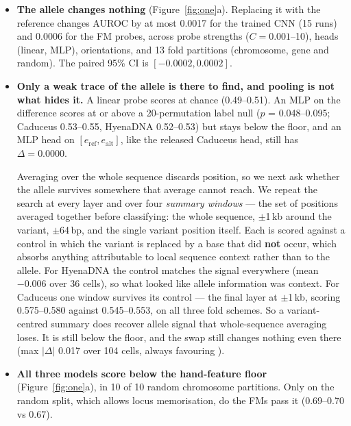 \begin{itemize}
\item \textbf{The allele changes nothing} (Figure~\ref{fig:one}a). Replacing it
with the reference changes AUROC by at most 0.0017 for the trained CNN (15 runs)
and 0.0006 for the FM probes, across probe strengths ($C = 0.001$--10), heads
(linear, MLP), orientations, and 13 fold partitions (chromosome, gene and
random). The paired 95\% CI is $[-0.0002, 0.0002]$.
\item \textbf{Only a weak trace of the allele is there to find, and pooling is
not what hides it.} A linear \diffonly{} probe scores at chance (0.49--0.51). An
MLP on the difference scores at or above a 20-permutation label null ($p$ =
0.048--0.095; Caduceus 0.53--0.55, HyenaDNA 0.52--0.53) but stays below the floor, and an MLP head on
$[e_{\mathrm{ref}}, e_{\mathrm{alt}}]$, like the released Caduceus head, still
has $\Delta = 0.0000$.

Averaging over the whole sequence discards position, so we next ask whether the
allele survives somewhere that average cannot reach. We repeat the search at
every layer and over four \emph{summary windows} --- the set of positions
averaged together before classifying: the whole sequence, $\pm$1\,kb around the
variant, $\pm$64\,bp, and the single variant position itself. Each is scored
against a control in which the variant is replaced by a base that did
\textbf{not} occur, which absorbs anything attributable to local sequence context
rather than to the allele. For HyenaDNA the control matches the signal
everywhere (mean $-0.006$ over 36 cells), so what looked like allele information
was context. For Caduceus one window survives its control --- the final layer at
$\pm$1\,kb, scoring 0.575--0.580 against 0.545--0.553, on all three fold schemes.
So a variant-centred summary does recover allele signal that whole-sequence
averaging loses. It is still below the floor, and the swap still changes nothing
even there (max $|\Delta|$ 0.017 over 104 cells, always favouring ).
\item \textbf{All three models score below the hand-feature floor}
(Figure~\ref{fig:one}a), in 10 of 10 random chromosome partitions. Only on the
random split, which allows locus memorisation, do the FMs pass it (0.69--0.70 vs
0.67).
\end{itemize}

